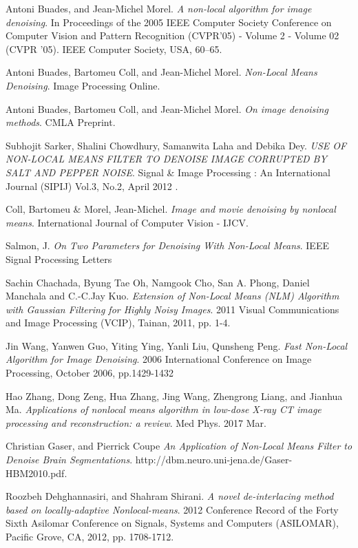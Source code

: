 \documentclass[11pt,letterpaper]{article}
\begin{document}
\begin{thebibliography}{9}
Antoni Buades, and Jean-Michel Morel.
\textit{A non-local algorithm for image denoising}.
In Proceedings of the 2005 IEEE Computer Society Conference on Computer Vision and Pattern Recognition (CVPR’05) - Volume 2 - Volume 02 (CVPR ’05). IEEE Computer Society, USA, 60–65.

Antoni Buades, Bartomeu Coll, and Jean-Michel Morel.
\textit{Non-Local Means Denoising}.
Image Processing Online.

Antoni Buades, Bartomeu Coll, and Jean-Michel Morel.
\textit{On image denoising methods}.
CMLA Preprint.

Subhojit Sarker, Shalini Chowdhury, Samanwita Laha and Debika Dey.
\textit{USE OF NON-LOCAL MEANS FILTER TO DENOISE IMAGE CORRUPTED BY SALT AND PEPPER NOISE}.
Signal \& Image Processing : An International Journal (SIPIJ) Vol.3, No.2, April 2012 .

Coll, Bartomeu \& Morel, Jean-Michel.
\textit{Image and movie denoising by nonlocal means}. International Journal of Computer Vision - IJCV. 

Salmon, J.
\textit{On Two Parameters for Denoising With Non-Local Means}.
IEEE Signal Processing Letters

Sachin Chachada, Byung Tae Oh, Namgook Cho, San A. Phong, Daniel Manchala and C.-C.Jay Kuo.
\textit{Extension of Non-Local Means (NLM) Algorithm with
	Gaussian Filtering for Highly Noisy Images}.
2011 Visual Communications and Image Processing (VCIP), Tainan, 2011, pp. 1-4.

Jin Wang, Yanwen Guo,  Yiting Ying, Yanli Liu, Qunsheng Peng.
\textit{Fast Non-Local Algorithm for Image Denoising}.
2006 International Conference on Image Processing, October 2006, pp.1429-1432

Hao Zhang, Dong Zeng, Hua Zhang, Jing Wang, Zhengrong Liang, and Jianhua Ma.
\textit{Applications of nonlocal means algorithm in low-dose X-ray CT image processing and reconstruction: a review}.
Med Phys. 2017 Mar.

Christian Gaser, and Pierrick Coupe
\textit{An Application of Non-Local Means Filter to Denoise Brain Segmentations}.
http://dbm.neuro.uni-jena.de/Gaser-HBM2010.pdf.

Roozbeh Dehghannasiri, and Shahram Shirani.
\textit{A novel de-interlacing method based on locally-adaptive Nonlocal-means}.
2012 Conference Record of the Forty Sixth Asilomar Conference on Signals, Systems and Computers (ASILOMAR), Pacific Grove, CA, 2012, pp. 1708-1712.

\end{thebibliography}
\end{document}
